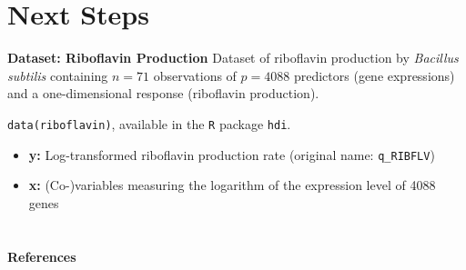 \documentclass[10pt]{beamer}
\begin{document}
\section{Next Steps}
\begin{frame}{\textbf{Dataset: Riboflavin Production}}
    Dataset of riboflavin production by \textit{Bacillus subtilis} containing 
    $n=71$ observations of $p=4088$ predictors (gene expressions) and a one-dimensional response (riboflavin production).
    
    \medskip
    \texttt{data(riboflavin)}, available in the \texttt{R} package \texttt{hdi}.
    
    \medskip
    \begin{itemize}
        \item \textbf{y:} Log-transformed riboflavin production rate (original name: \texttt{q\_RIBFLV})
        \item \textbf{x:} (Co-)variables measuring the logarithm of the expression level of 4088 genes
    \end{itemize}
\end{frame}

\section{}
\begin{frame}[allowframebreaks]{\textbf{References}}
    \nocite{*}
    \printbibliography
\end{frame}
\end{document}
